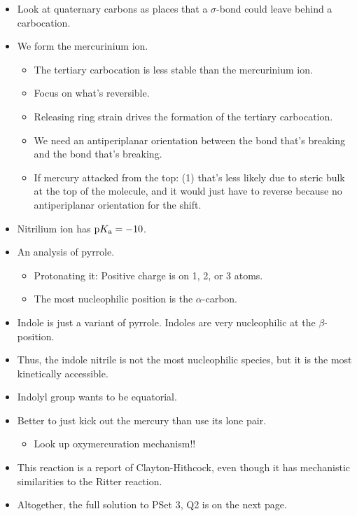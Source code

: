 \documentclass[../notes.tex]{subfiles}
\begin{document}
\begin{itemize}
    \item Look at quaternary carbons as places that a  $\sigma$-bond could leave behind a carbocation.
    \item We form the mercurinium ion.
    \begin{itemize}
        \item The tertiary carbocation is less stable than the mercurinium ion.
        \item Focus on what's reversible.
        \item Releasing ring strain drives the formation of the tertiary carbocation.
        \item We need an antiperiplanar orientation between the  bond that's breaking and the  bond that's breaking.
        \item If mercury attacked from the top: (1) that's less likely due to steric bulk at the top of the molecule, and it would just have to reverse because no antiperiplanar orientation for the shift.
    \end{itemize}
    \item Nitrilium ion has $\textup{p}K_\textup{a}=-10$.
    \item An analysis of pyrrole.
    \begin{itemize}
        \item Protonating it: Positive charge is on 1, 2, or 3 atoms.
        \item The most nucleophilic position is the $\alpha$-carbon.
    \end{itemize}
    \item Indole is just a variant of pyrrole. Indoles are very nucleophilic at the $\beta$-position.
    \item Thus, the indole nitrile is not the most nucleophilic species, but it is the most kinetically accessible.
    \item Indolyl group wants to be equatorial.
    \item Better to just kick out the mercury than use its lone pair.
    \begin{itemize}
        \item Look up oxymercuration mechanism!!
    \end{itemize}
    \item This reaction is a report of Clayton-Hithcock, even though it has mechanistic similarities to the Ritter reaction.
    \item Altogether, the full solution to PSet 3, Q2 is on the next page.
    \begin{figure}[H]

\end{figure}
\end{itemize}
\end{document}
